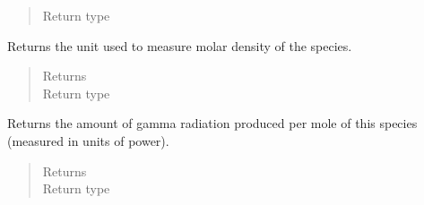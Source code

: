 \documentclass[letterpaper,10pt,openany,oneside,english]{sphinxmanual}
\begin{document}
\begin{fulllineitems}
\begin{fulllineitems}
\begin{quote}
\begin{description}
\item[{Return type}] \leavevmode
{}

\end{description}\end{quote}

\end{fulllineitems}


\begin{fulllineitems}
\label{\detokenize{support_rst/specie:specie.Specie.molarCCUnit}}
Returns the unit used to measure molar density of the species.
\begin{quote}\begin{description}
\item[{Returns}] \leavevmode
{}

\item[{Return type}] \leavevmode
{}

\end{description}\end{quote}

\end{fulllineitems}


\begin{fulllineitems}
\label{\detokenize{support_rst/specie:specie.Specie.molarGammaPwr}}
Returns the amount of gamma radiation produced per mole of this species
(measured in units of power).
\begin{quote}\begin{description}
\item[{Returns}] \leavevmode
{}

\item[{Return type}] \leavevmode
{}

\end{description}\end{quote}

\end{fulllineitems}



\end{fulllineitems}
\end{document}
